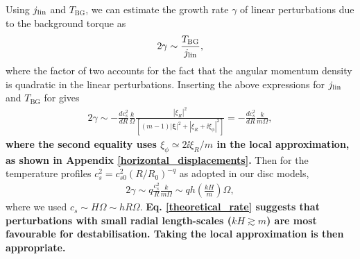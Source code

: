 Using $j_\mathrm{lin}$ and $T_\mathrm{BG}$, we can estimate the 
growth rate $\gamma$ of linear perturbations due to the background
torque as  
\begin{align}
  2\gamma \sim \frac{T_\mathrm{BG}}{j_\mathrm{lin}},
\end{align}
where the factor of two accounts for the fact that the angular momentum
density is quadratic in the linear perturbations. Inserting the above
expressions for $j_\mathrm{lin}$ and $T_\mathrm{BG}$ for gives
\begin{align}\label{theoretical_rate0}
  2\gamma \sim
  -\frac{dc_s^2}{dR}
  \frac{k}{\Omega}\frac{|\xi_R|^2}{\left[(m-1)|\bm{\xi}|^2 + |\xi_R +
      \ii\xi_\phi|^2 \right]} 
  = -\frac{dc_s^2}{dR}
  \frac{k}{m\Omega},
\end{align}
{\bf where the second equality uses $\xi_\phi \simeq
2\ii \xi_R/m$ in the local approximation, as shown in  Appendix
\ref{horizontal_displacements}.} 
Then 
for the temperature profiles $c_s^2 = c_{s0}^2 (R/R_0)^{-q}$ as
adopted in our disc models,  
\begin{align}
  2\gamma \sim q\frac{c_s^2}{R}\frac{k}{m\Omega} \sim q h
  \left(\frac{kH}{m}\right)\Omega,\label{theoretical_rate}
\end{align}
where we used $c_s\sim H\Omega\sim hR\Omega$. {\bf
  Eq. \ref{theoretical_rate} suggests that perturbations with small
  radial length-scales ($kH\gtrsim m$) are most favourable for
  destabilisation. Taking the local approximation is then
  appropriate.}       


